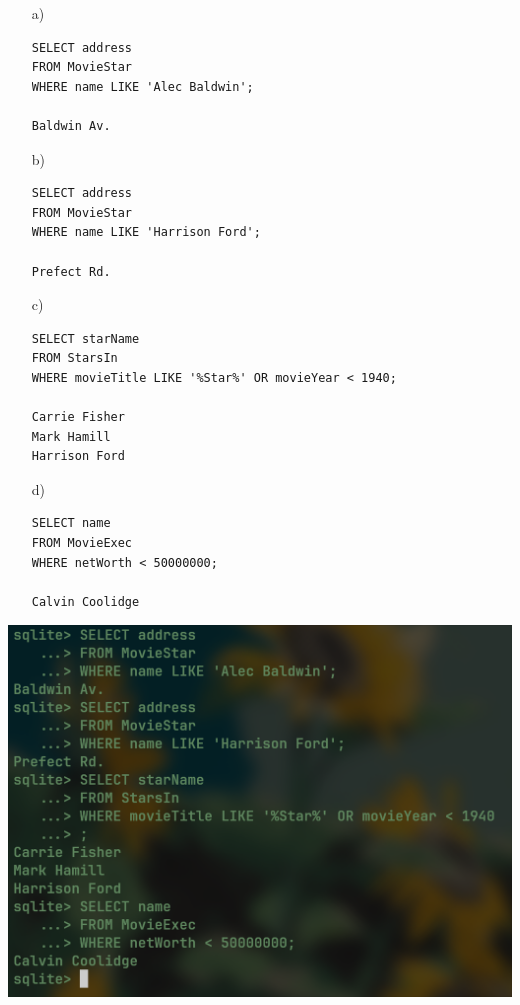 \documentclass{article}
\begin{document}
	\begin{itemize}
		\item[a)]
	\begin{verbatim}
SELECT address
FROM MovieStar
WHERE name LIKE 'Alec Baldwin';

Baldwin Av.
	\end{verbatim}

		\item[b)]
	\begin{verbatim}
SELECT address
FROM MovieStar
WHERE name LIKE 'Harrison Ford';

Prefect Rd.
	\end{verbatim}

		\item[c)]
	\begin{verbatim}
SELECT starName
FROM StarsIn
WHERE movieTitle LIKE '%Star%' OR movieYear < 1940;

Carrie Fisher
Mark Hamill
Harrison Ford
	\end{verbatim}
	
		\item[d)]
	\begin{verbatim}
SELECT name
FROM MovieExec
WHERE netWorth < 50000000;

Calvin Coolidge
	\end{verbatim}
	\end{itemize}	

	\begin{center}
	\includegraphics[scale=0.375]{data.png}
	\end{center}
\end{document}
